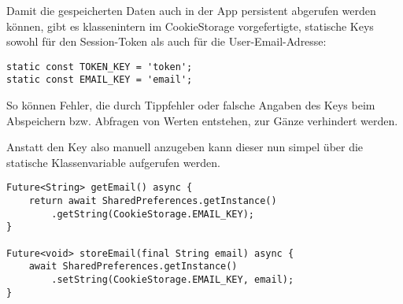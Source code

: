 Damit die gespeicherten Daten auch in der App persistent abgerufen werden können, gibt es klassenintern
im CookieStorage vorgefertigte, statische Keys sowohl für den Session-Token als auch für die User-Email-Adresse:

\begin{lstlisting}
static const TOKEN_KEY = 'token';
static const EMAIL_KEY = 'email';
\end{lstlisting}

So können Fehler, die durch Tippfehler oder falsche Angaben des Keys beim Abspeichern bzw. Abfragen
von Werten entstehen, zur Gänze verhindert werden.

Anstatt den Key also manuell anzugeben kann dieser nun simpel über die statische Klassenvariable
aufgerufen werden.

\begin{lstlisting}
Future<String> getEmail() async {
    return await SharedPreferences.getInstance()
        .getString(CookieStorage.EMAIL_KEY);
}

Future<void> storeEmail(final String email) async {
    await SharedPreferences.getInstance()
        .setString(CookieStorage.EMAIL_KEY, email);
}
\end{lstlisting}






